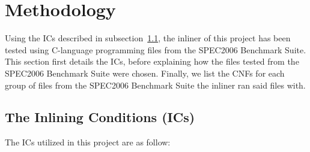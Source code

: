 
\clearpage
\section{Methodology}
\label{sec:methodology}

Using the ICs described in subsection~\ref{sub:meth:inlining_conditions}, the
inliner of this project has been tested using C-language programming files from
the SPEC2006 Benchmark Suite. This section first details the ICs, before
explaining how the files tested from the SPEC2006 Benchmark Suite were chosen.
Finally, we list the CNFs for each group of files from the SPEC2006 Benchmark
Suite the inliner ran said files with.

\subsection{The Inlining Conditions (ICs)}
\label{sub:meth:inlining_conditions}

The ICs utilized in this project are as follow:

